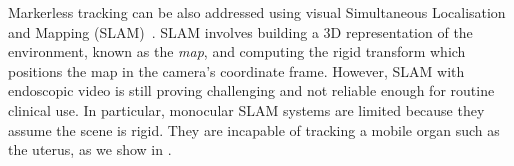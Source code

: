 Markerless tracking can be also addressed using visual Simultaneous Localisation and Mapping (SLAM)~\cite{Thrun2002Robotic,Mahmoud2017}. 
SLAM involves building a 3D representation of the environment, known as the \textit{map}, and computing the rigid transform which positions the map in the camera's coordinate frame. 
However, SLAM with endoscopic video is still proving challenging and not reliable enough for routine clinical use. %
In particular, monocular SLAM systems are limited because they assume the scene is rigid. They are incapable of tracking a mobile organ such as the uterus, as we show in .


